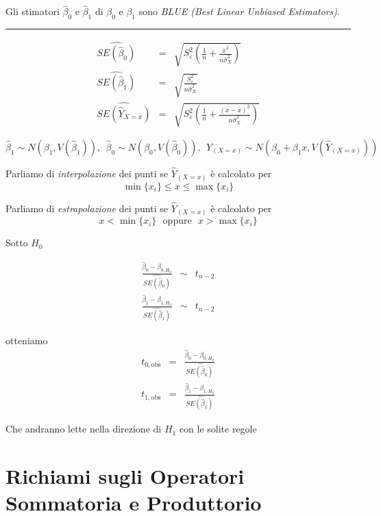 \documentclass[
  11pt,
]{book}
\theoremstyle{mytheoremstyle}
\theoremstyle{mydefstyle}
\begin{document}
Gli stimatori \(\hat\beta_{0}\) e \(\hat\beta_{1}\) di \(\beta_{0}\) e \(\beta_{1}\)
sono \emph{BLUE (Best Linear Unbiased Estimators)}.

\begin{center}\rule{0.5\linewidth}{0.5pt}\end{center}

\begin{eqnarray*}
\widehat{SE(\hat\beta_{0})} &=& \sqrt{S_{\varepsilon}^{2} \left( \frac{1} {n} +  \frac{\bar{x}^{2}} {n \hat{\sigma}^{2}_{X}} \right)}\\
\widehat{SE(\hat\beta_{1})}           &=& \sqrt{\frac{S_{\varepsilon}^{2}} {n\hat{\sigma}^{2}_{X}} }\\
\widehat{SE(\widehat{Y}_{X=x})}&=& \sqrt{S_{\varepsilon}^{2}\left( \frac{1} {n} +  \frac{(x - \bar{x})^{2}} {n\hat{\sigma}^{2}_{X}} \right)}
\end{eqnarray*}

\[\hat\beta_1\sim N(\beta_1,V(\hat\beta_1)), ~~\hat\beta_0\sim N(\beta_0,V(\hat\beta_0)), ~~\hat Y_{(X=x)}\sim N\left(\beta_0+\beta_1 x,V(\hat Y_{(X=x)})\right)\]

Parliamo di \emph{interpolazione} dei punti se \(\hat Y_{(X=x)}\) è calcolato per
\[\min\{x_i\}\leq x \leq\max\{x_i\}\]

Parliamo di \emph{estrapolazione} dei punti se \(\hat Y_{(X=x)}\) è calcolato per
\[x<\min\{x_i\}~~~\text{oppure}~~~ x >\max\{x_i\}\]

Sotto \(H_0\)

\begin{eqnarray*}
 \frac{\hat\beta_0-\beta_{0,H_0}}{\widehat{SE(\hat\beta_0)}} &\sim& t_{n-2} \\
 \frac{\hat\beta_1-\beta_{1,H_0}}{\widehat{SE(\hat\beta_1)}} &\sim& t_{n-2}
\end{eqnarray*}

otteniamo
\begin{eqnarray*}
t_{0,\text{obs}} &=& \frac{\hat\beta_0-\beta_{0,H_0}}{\widehat{SE(\hat\beta_0)}} \\
t_{1,\text{obs}} &=& \frac{\hat\beta_1-\beta_{1,H_0}}{\widehat{SE(\hat\beta_1)}}
\end{eqnarray*}

Che andranno lette nella direzione di \(H_1\) con le solite regole

\chapter{Richiami sugli Operatori Sommatoria e Produttorio}\label{richiami-sugli-operatori-sommatoria-e-produttorio}
\end{document}

